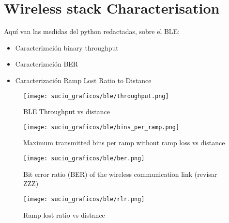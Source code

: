 \section{Wireless stack Characterisation}
Aquí van las medidas del python redactadas, sobre el BLE:
\begin{itemize}
	\item Caracterización binary throughput
	\item Caracterización BER
	\item Caracterización Ramp Lost Ratio to Distance
\end{itemize}
\begin{figure}[ht]
	\centering
	\texttt{[image: sucio\_graficos/ble/throughput.png]}
	\caption{BLE Throughput vs distance}
	\label{fig:moduloaprox50cmplancha}
\end{figure}
\begin{figure}[ht]
	\centering
	\texttt{[image: sucio\_graficos/ble/bins\_per\_ramp.png]}
	\caption{Maximum transmitted bins per ramp without ramp loss vs distance}
	\label{fig:moduloaprox50cmplancha}
\end{figure}
\begin{figure}[ht]
	\centering
	\texttt{[image: sucio\_graficos/ble/ber.png]}
	\caption{Bit error ratio (BER) of the wireless communication link (revisar ZZZ)}
	\label{fig:moduloaprox50cmplancha}
\end{figure}
\begin{figure}[ht]
	\centering
	\texttt{[image: sucio\_graficos/ble/rlr.png]}
	\caption{Ramp lost ratio vs distance}
	\label{fig:moduloaprox50cmplancha}
\end{figure}





